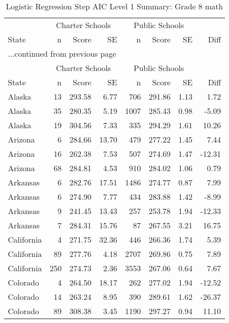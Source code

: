 \begin{longtable}{lrrr@{\extracolsep{10pt}}rrrr}
\caption{Logistic Regression Step AIC Level 1 Summary: Grade 8 math} \\ 
  \hline
  & \multicolumn{3}{c}{Charter Schools} & \multicolumn{3}{c}{Public Schools} & \\ \cline{2-4} \cline{5-7} State & n & Score & SE & n & Score & SE & Diff \\ \endfirsthead \multicolumn{8}{l}{{...continued from previous page}}\\ \hline & \multicolumn{3}{c}{Charter Schools} & \multicolumn{3}{c}{Public Schools} & \\ \cline{2-4} \cline{5-7} State & n & Score & SE & n & Score & SE & Diff \\ \hline \endhead \hline \endfoot \endlastfoot \hline
Alaska &  13 & 293.58 & 6.77 & 706 & 291.86 & 1.13 & 1.72 \\ 
  Alaska &  35 & 280.35 & 5.19 & 1007 & 285.43 & 0.98 & -5.09 \\ 
  Alaska &  19 & 304.56 & 7.33 & 335 & 294.29 & 1.61 & 10.26 \\ 
  Arizona &   6 & 284.66 & 13.70 & 479 & 277.22 & 1.45 & 7.44 \\ 
  Arizona &  16 & 262.38 & 7.53 & 507 & 274.69 & 1.47 & -12.31 \\ 
  Arizona &  68 & 284.81 & 4.53 & 910 & 284.02 & 1.06 & 0.79 \\ 
  Arkansas &   6 & 282.76 & 17.51 & 1486 & 274.77 & 0.87 & 7.99 \\ 
  Arkansas &   6 & 274.90 & 7.77 & 434 & 283.88 & 1.42 & -8.99 \\ 
  Arkansas &   9 & 241.45 & 13.43 & 257 & 253.78 & 1.94 & -12.33 \\ 
  Arkansas &   7 & 284.31 & 15.76 &  87 & 267.55 & 3.21 & 16.75 \\ 
  California &   4 & 271.75 & 32.36 & 446 & 266.36 & 1.74 & 5.39 \\ 
  California &  89 & 277.76 & 4.18 & 2707 & 269.86 & 0.75 & 7.89 \\ 
  California & 250 & 274.73 & 2.36 & 3553 & 267.06 & 0.64 & 7.67 \\ 
  Colorado &   4 & 264.50 & 18.17 & 262 & 277.02 & 1.94 & -12.52 \\ 
  Colorado &  14 & 263.24 & 8.95 & 390 & 289.61 & 1.62 & -26.37 \\ 
  Colorado &  89 & 308.38 & 3.45 & 1190 & 297.27 & 0.94 & 11.10 \\ 

\end{longtable}
